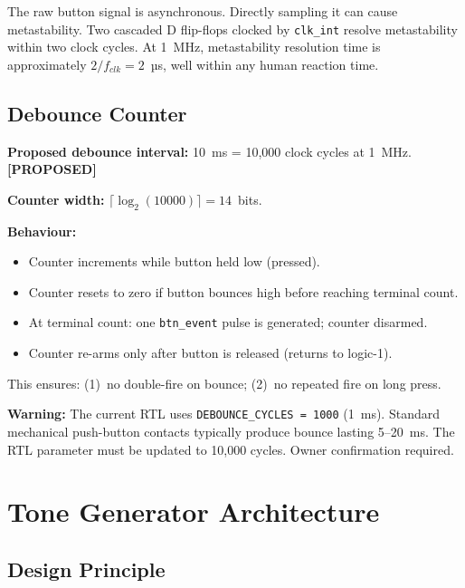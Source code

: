 \documentclass[11pt,a4paper]{article}
\newcommand{\proposed}{\textcolor{proposed}{\textbf{[PROPOSED]}}}
\begin{document}
The raw button signal is asynchronous. Directly sampling it can cause metastability.
Two cascaded D flip-flops clocked by \texttt{clk\_int} resolve metastability within two clock
cycles. At 1~MHz, metastability resolution time is approximately $2/f_{clk} = 2$~µs, well within
any human reaction time.

\subsection{Debounce Counter}

\textbf{Proposed debounce interval:} 10~ms = 10,000 clock cycles at 1~MHz. \proposed

\textbf{Counter width:} $\lceil \log_2(10000) \rceil = 14$~bits.

\textbf{Behaviour:}
\begin{itemize}
  \item Counter increments while button held low (pressed).
  \item Counter resets to zero if button bounces high before reaching terminal count.
  \item At terminal count: one \texttt{btn\_event} pulse is generated; counter disarmed.
  \item Counter re-arms only after button is released (returns to logic-1).
\end{itemize}

This ensures: (1)~no double-fire on bounce; (2)~no repeated fire on long press.

\begin{mdframed}[backgroundcolor=riskamb!10,linecolor=riskamb]
  \textbf{Warning:} The current RTL uses \texttt{DEBOUNCE\_CYCLES = 1000} (1~ms). Standard
  mechanical push-button contacts typically produce bounce lasting 5--20~ms. The RTL parameter
  must be updated to 10,000 cycles. Owner confirmation required.
\end{mdframed}

\section{Tone Generator Architecture}

\subsection{Design Principle}
\end{document}
